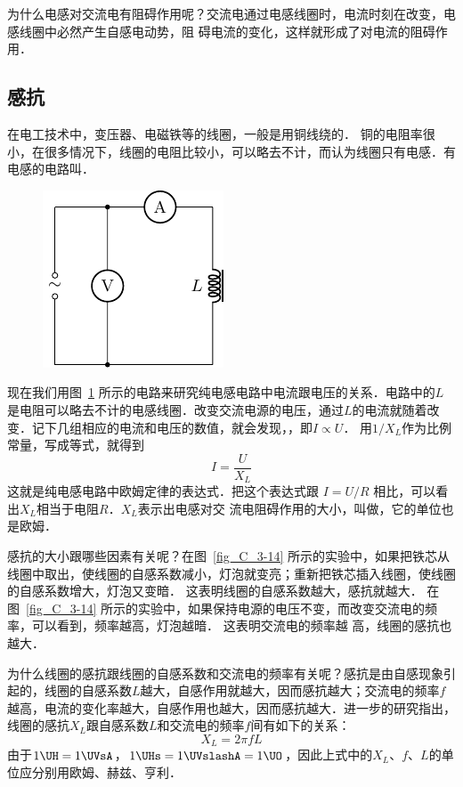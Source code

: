 为什么电感对交流电有阻碍作用呢？交流电通过电感线圈时，电流时刻在改变，电感线圈中必然产生自感电动势，阻
碍电流的变化，这样就形成了对电流的阻碍作用．

\subsection{感抗}

在电工技术中，变压器、电磁铁等的线圈，一般是用铜线绕的．
铜的电阻率很小，在很多情况下，线圈的电阻比较小，可以略去不计，而认为线圈只有电感．有电感的电路叫．
\begin{figure}[htbp]
    \centering
    \includegraphics{fig/C/3-15.pdf}
    \caption{}\label{fig_C_3-15}
\end{figure}
	
现在我们用图~\ref{fig_C_3-15} 所示的电路来研究纯电感电路中电流跟电压的关系．电路中的$L$是电阻可以略去不计的电感线圈．改变交流电源的电压，通过$L$的电流就随着改变．记下几组相应的电流和电压的数值，就会发现，，即$I\propto U$． 用$1/X_L$作为比例常量，写成等式，就得到
\[I=\frac{U}{X_L} \]
这就是纯电感电路中欧姆定律的表达式．把这个表达式跟
$I=U/R$
相比，可以看出$X_L$相当于电阻$R$．$X_L$表示出电感对交
流电阻碍作用的大小，叫做，它的单位也是欧姆．

感抗的大小跟哪些因素有关呢？在图~\ref{fig_C_3-14} 所示的实验中，如果把铁芯从线圈中取出，使线圈的自感系数减小，灯泡就变亮；重新把铁芯插入线圈，使线圈的自感系数增大，灯泡又变暗．
这表明线圈的自感系数越大，感抗就越大．
在图~\ref{fig_C_3-14} 所示的实验中，如果保持电源的电压不变，而改变交流电的频率，可以看到，频率越高，灯泡越暗．
这表明交流电的频率越	
高，线圈的感抗也越大．

为什么线圈的感抗跟线圈的自感系数和交流电的频率有关呢？感抗是由自感现象引起的，线圈的自感系数$L$越大，自感作用就越大，因而感抗越大；交流电的频率$f$越高，电流的变化率越大，自感作用也越大，因而感抗越大．进一步的研究指出，线圈的感抗$X_L$跟自感系数$L$和交流电的频率$f$间有如下的关系：
\[X_L=2\pi fL\]
由于$1 \UH=1\UVsA$，$1\UHs=1\UVslashA=1\UO$，因此上式中的$X_L$、$f$、$L$的单位应分别用欧姆、赫兹、亨利．

